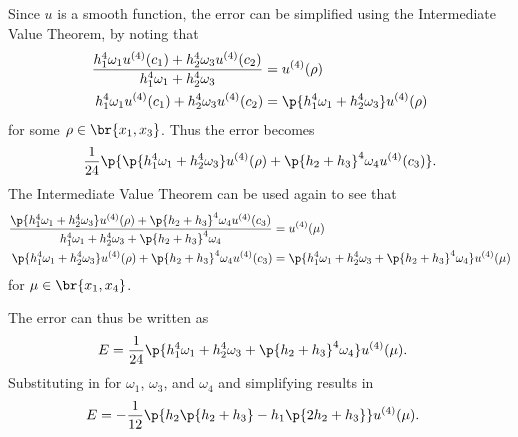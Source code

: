 \documentclass[11pt, oneside]{article}
\begin{document}
\begin{enumerate}
        Since $u$ is a smooth function, the error can be simplified using the
        Intermediate Value Theorem, by noting that
        \begin{align*}
            \frac{h_1^4 \omega_1 u^{(4)}(c_1) + h_2^4 \omega_3 u^{(4)}(c_2)}{h_1^4 \omega_1 + h_2^4 \omega_3} &= u^{(4)}(\rho) \\
            h_1^4 \omega_1 u^{(4)}(c_1) + h_2^4 \omega_3 u^{(4)}(c_2) &= \p{h_1^4 \omega_1 + h_2^4 \omega_3} u^{(4)}(\rho)
        \end{align*}
        for some $\rho \in \br{x_1, x_3}$.
        Thus the error becomes
        \begin{align*}
            \frac{1}{24}\p{\p{h_1^4 \omega_1 + h_2^4 \omega_3}u^{(4)}(\rho)+ \p{h_2 + h_3}^4 \omega_4 u^{(4)}(c_3)}.
        \end{align*}
        The Intermediate Value Theorem can be used again to see that
        \begin{align*}
            \frac{\p{h_1^4 \omega_1 + h_2^4 \omega_3}u^{(4)}(\rho)+ \p{h_2 + h_3}^4 \omega_4 u^{(4)}(c_3)}{h_1^4 \omega_1 + h_2^4 \omega_3 + \p{h_2 + h_3}^4 \omega_4} &= u^{(4)}(\mu) \\
            \p{h_1^4 \omega_1 + h_2^4 \omega_3}u^{(4)}(\rho)+ \p{h_2 + h_3}^4 \omega_4 u^{(4)}(c_3) &= \p{h_1^4 \omega_1 + h_2^4 \omega_3 + \p{h_2 + h_3}^4 \omega_4} u^{(4)}(\mu)
        \end{align*}
        for $\mu \in \br{x_1, x_4}$.

        The error can thus be written as
        \begin{align*}
            E &= \frac{1}{24}\p{h_1^4 \omega_1 + h_2^4 \omega_3 + \p{h_2 + h_3}^4 \omega_4} u^{(4)}(\mu).
        \end{align*}
        Substituting in for $\omega_1$, $\omega_3$, and $\omega_4$ and
        simplifying results in
        \begin{align*}
            E &= -\frac{1}{12} \p{h_2\p{h_2 + h_3} - h_1 \p{2 h_2 + h_3}} u^{(4)}(\mu).
        \end{align*}


\end{enumerate}
\end{document}
